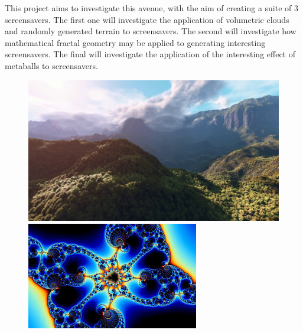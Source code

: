 \documentclass[10pt, openany]{book}
\begin{document}
This project aims to investigate this avenue, with the aim of creating a suite of 3 screensavers. The first one will investigate the application of volumetric clouds and randomly generated terrain to screensavers. The second will investigate how mathematical fractal geometry may be applied to generating interesting screensavers. The final will investigate the application of the interesting effect of metaballs to screensavers. 

\begin{figure}[H]
\centering
\begin{minipage}{.3\textwidth}
  \centering
  \includegraphics[width=.9\linewidth]{rainforest}
\end{minipage}%
\begin{minipage}{.3\textwidth}
  \centering
  \includegraphics[width=.9\linewidth]{mandelbrot}
\end{minipage}%
\begin{minipage}{.3\textwidth}
  \centering

\end{minipage}
\end{figure}
\end{document}
